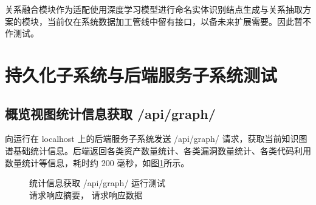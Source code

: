 \documentclass[a4paper,AutoFakeBold,oneside,12pt]{book}
\begin{document}
关系融合模块作为适配使用深度学习模型进行命名实体识别结点生成与关系抽取方案的模块，当前仅在系统数据加工管线中留有接口，以备未来扩展需要。因此暂不作测试。

\section{持久化子系统与后端服务子系统测试}

\subsection{概览视图统计信息获取 /api/graph/}

向运行在 localhost 上的后端服务子系统发送 /api/graph/ 请求，获取当前知识图谱基础统计信息。后端返回各类资产数量统计、各类漏洞数量统计、各类代码利用数量统计等信息，耗时约 200 毫秒，如图\ref{Fig:Backend_api_graph}所示。



\begin{figure}[!htbp]
	\centering
	\quad %
	\caption{统计信息获取 /api/graph/ 运行测试\\ \protect{} 请求响应摘要，\protect{} 请求响应数据}
	\label{Fig:Backend_api_graph}
\end{figure}
\end{document}
